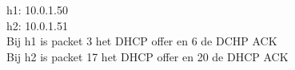 h1: 10.0.1.50\\

h2: 10.0.1.51\\

Bij h1 is packet 3 het DHCP offer en 6 de DCHP ACK\\

Bij h2 is packet 17 het DHCP offer en 20 de DHCP ACK